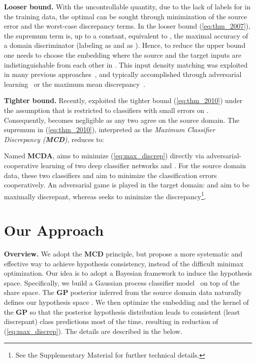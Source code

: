 \documentclass[10pt,letterpaper]{article}
\begin{document}
\textbf{Looser bound.} With  the uncontrollable quantity, due to the lack of labels for  in the training data, the optimal  can be sought through minimization of the source error  and the worst-case discrepancy terms.  In the looser bound (\ref{eq:thm_2007}), the supremum term is, up to a constant, equivalent to , the maximal accuracy of a domain discriminator (labeling  as  and  as ). Hence, to reduce the upper bound one needs to choose the embedding  where the source and the target inputs are indistinguishable from each other in . This input density matching was exploited in many previous approaches~\cite{dom_conf,grl16,bousmalis2016domain,tzeng2017adversarial}, and typically accomplished through adversarial learning~\cite{gan14} or the maximum mean discrepancy~\cite{mmd}.









\textbf{Tighter bound.} Recently, \cite{saito2018} exploited the tighter bound (\ref{eq:thm_2010}) under the assumption that  is restricted to classifiers with small errors on . Consequently,  becomes negligible as any two   agree on the source domain. The supremum in (\ref{eq:thm_2010}), interpreted as the \textit{Maximum Classifier Discrepancy (\textbf{MCD})}, reduces to:

Named \textbf{MCDA}, \cite{saito2018} aims to minimize (\ref{eq:max_discrep}) directly via adversarial-cooperative learning of two deep classifier networks  and . For the source domain data, these two classifiers and  aim to minimize the classification errors cooperatively. An adversarial game is played in the target domain:  and  aim to be maximally discrepant, whereas  seeks to minimize the discrepancy\footnote{See the Supplementary Material for further technical details.}. 










\section{Our Approach}\label{sec:ours}

\textbf{Overview.} We adopt the \textbf{MCD} principle, but propose a more systematic and effective way to achieve hypothesis consistency, instead of the difficult minimax optimization. Our idea is to adopt a Bayesian framework to induce the hypothesis space. Specifically, we build a Gaussian process classifier model~\cite{gpml_book} on top of the share space. The \textbf {GP} posterior inferred from the source domain data naturally defines our hypothesis space . We then optimize the embedding  and the kernel of the \textbf {GP} so that the posterior hypothesis distribution leads to consistent (least discrepant) class predictions most of the time, resulting in reduction of (\ref{eq:max_discrep}). The details are described in the below.
\end{document}
